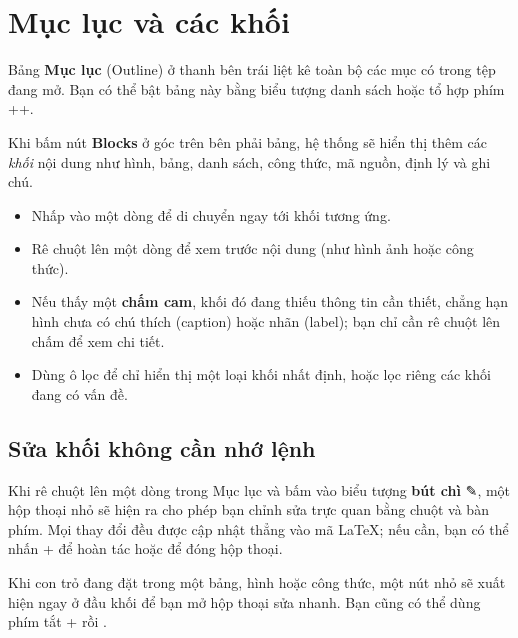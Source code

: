 \section{Mục lục và các khối}
\label{sec:muc-luc}

Bảng \textbf{Mục lục} (Outline) ở thanh bên trái liệt kê toàn bộ các mục có
trong tệp đang mở. Bạn có thể bật bảng này bằng biểu tượng danh sách hoặc tổ
hợp phím ++.

\begin{minipage}[t]{0.28\linewidth}
  \vspace{0pt}
\end{minipage}\hfill
\begin{minipage}[t]{0.66\linewidth}
  \vspace{0pt}
  Khi bấm nút \textbf{Blocks} ở góc trên bên phải bảng, hệ thống sẽ hiển thị
  thêm các \emph{khối} nội dung như hình, bảng, danh sách, công thức, mã nguồn,
  định lý và ghi chú.
  \begin{itemize}
    \item Nhấp vào một dòng để di chuyển ngay tới khối tương ứng.
    \item Rê chuột lên một dòng để xem trước nội dung (như hình ảnh hoặc công
      thức).
    \item Nếu thấy một \textbf{chấm cam}, khối đó đang thiếu thông tin cần
      thiết, chẳng hạn hình chưa có chú thích (caption) hoặc nhãn (label); bạn
      chỉ cần rê chuột lên chấm để xem chi tiết.
    \item Dùng ô lọc  để chỉ hiển thị một loại khối nhất định, hoặc lọc
      riêng các khối đang có vấn đề.
  \end{itemize}
\end{minipage}

\subsection{Sửa khối không cần nhớ lệnh}
Khi rê chuột lên một dòng trong Mục lục và bấm vào biểu tượng \textbf{bút chì}
✎, một hộp thoại nhỏ sẽ hiện ra cho phép bạn chỉnh sửa trực quan bằng chuột và
bàn phím. Mọi thay đổi đều được cập nhật thẳng vào mã \LaTeX{}; nếu cần, bạn
có thể nhấn + để hoàn tác hoặc  để đóng hộp thoại.

\begin{meo}
Khi con trỏ đang đặt trong một bảng, hình hoặc công thức, một nút nhỏ
 sẽ xuất hiện ngay ở đầu khối để bạn mở hộp thoại sửa nhanh. Bạn
cũng có thể dùng phím tắt + rồi .
\end{meo}

